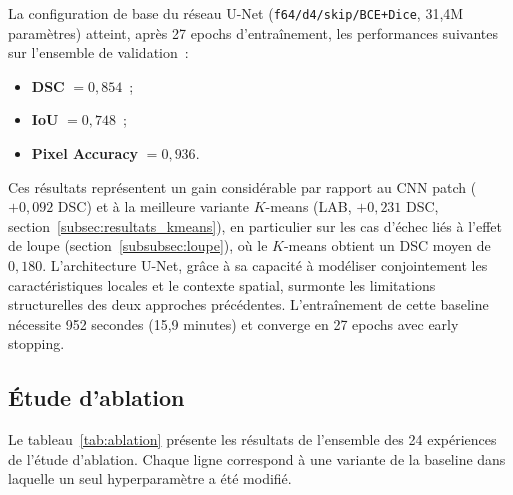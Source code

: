 \documentclass[12pt,a4paper]{article}
\begin{document}
La configuration de base du réseau U-Net (\texttt{f64/d4/skip/BCE+Dice}, 31,4M paramètres) atteint, après 27 epochs d'entraînement, les performances suivantes sur l'ensemble de validation~:
\begin{itemize}[nosep]
    \item \textbf{DSC} $= 0{,}854$~;
    \item \textbf{IoU} $= 0{,}748$~;
    \item \textbf{Pixel Accuracy} $= 0{,}936$.
\end{itemize}

Ces résultats représentent un gain considérable par rapport au CNN patch ($+0{,}092$ DSC) et à la meilleure variante $K$-means (LAB, $+0{,}231$ DSC, section~\ref{subsec:resultats_kmeans}), en particulier sur les cas d'échec liés à l'effet de loupe (section~\ref{subsubsec:loupe}), où le $K$-means obtient un DSC moyen de $0{,}180$. L'architecture U-Net, grâce à sa capacité à modéliser conjointement les caractéristiques locales et le contexte spatial, surmonte les limitations structurelles des deux approches précédentes. L'entraînement de cette baseline nécessite 952 secondes (15,9 minutes) et converge en 27 epochs avec early stopping.

\subsection{Étude d'ablation}
\label{subsec:ablation_resultats}

Le tableau~\ref{tab:ablation} présente les résultats de l'ensemble des 24 expériences de l'étude d'ablation. Chaque ligne correspond à une variante de la baseline dans laquelle un seul hyperparamètre a été modifié.
\end{document}
